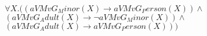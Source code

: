 \documentclass[a4paper,10pt]{article}
\begin{document}
 \newcommand{\nxt}{{\ensuremath\raisebox{0.25ex}{\text{\scriptsize$\bigcirc$}}}}
\newcommand{\Rdiamond}{\Diamond_{\!F}}
\newcommand{\Rbox}{\Box_{\!F}}
\newcommand{\Rnext}{\nxt_{\!F}}
\newcommand{\Ldiamond}{\Diamond_{\!P}}
\newcommand{\Lbox}{\Box_{\!P}}
\newcommand{\Lnext}{\nxt_{\!P}}
\newcommand{\SVdiamond}{\mathop{\ooalign{$\Diamond$ \cr \kern0.5ex
    \raisebox{0.35ex}{\scalebox{0.7}{$*$}}} \kern-0.9ex}}
\newcommand{\SVbox}{\mathop{\ooalign{$\Box$ \cr \kern0.42ex
    \raisebox{0.3ex}{\scalebox{0.7}{$*$}}} \kern-0.9ex}}


$ \forall X. ((aVMvG_Minor(X) \rightarrow aVMvG_Person(X)) \land $ \\ 
 $ (aVMvG_Adult(X) \rightarrow  \lnot aVMvG_Minor(X)) \land $ \\ 
 $ (aVMvG_Adult(X) \rightarrow aVMvG_Person(X)))$ 
\end{document}
